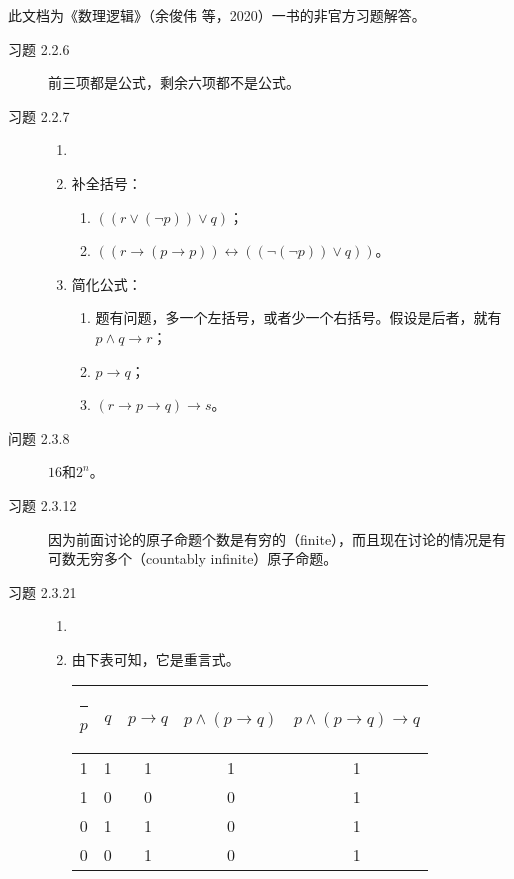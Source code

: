 \documentclass[punct=custom/kaiming,fontset=none]{ctexart}
\title{\Large\bfseries\titleContent}
\title{\bfseries\titleContent}
\author{\authorContent}
\makeatletter
\def\hhline{%
  \noalign{\ifnum0=`}\fi\hrule \@height 2\arrayrulewidth \futurelet
   \reserved@a\@xhline}
\makeatother
\begin{document}
\maketitle

此文档为《数理逻辑》（余俊伟 等，2020）一书的非官方习题解答。

\begin{description}
\item[习题 2.2.6] 前三项都是公式，剩余六项都不是公式。
\item[习题 2.2.7]
  \begin{enumerate}
  \item[]
  \item 补全括号：
    \begin{enumerate}
    \item \(((r \vee (\neg p)) \vee q)\)；
    \item \(((r \to (p \to p)) \leftrightarrow ((\neg(\neg p)) \vee q))\)。
    \end{enumerate}
  \item 简化公式：
    \begin{enumerate}
    \item 题有问题，多一个左括号，或者少一个右括号。假设是后者，就有\(p \wedge q \to r\)；
    \item \(p \to q\)；
    \item \((r \to p \to q) \to s\)。
    \end{enumerate}
  \end{enumerate}
\item[问题 2.3.8] \(16\)和\(2^n\)。
\item[习题 2.3.12] 因为前面讨论的原子命题个数是有穷的（finite），而且现在讨论的情况是有可数无穷多个（countably infinite）原子命题。
\item[习题 2.3.21]
  \begin{enumerate}
  \item[]
  \item 由下表可知，它是重言式。
    \begin{table}[H]
      \centering
      \begin{tabular}[t]{ccccc}
        \hhline
        \(p\) & \(q\) & \(p \to q\) & \(p \land (p \to q)\) & \(p \land (p \to q) \to q\) \\
        \hline
        1 & 1 & 1 & 1 & 1 \\
        1 & 0 & 0 & 0 & 1 \\
        0 & 1 & 1 & 0 & 1 \\
        0 & 0 & 1 & 0 & 1 \\

\end{tabular}
\end{table}
\end{enumerate}
\end{description}
\end{document}
